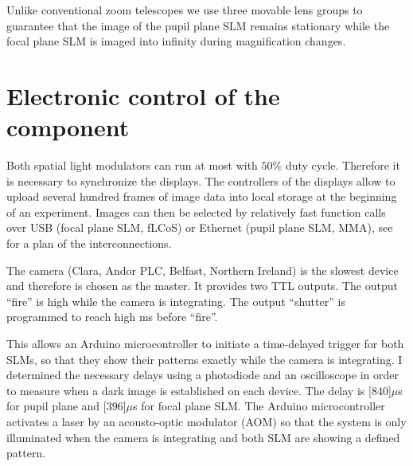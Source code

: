 Unlike conventional zoom telescopes we use three movable lens groups
to guarantee that the image of the pupil plane SLM remains stationary
while the focal plane SLM is imaged into infinity during magnification
changes.



\section{Electronic control of the component}
Both spatial light modulators can run at most with $50\%$ duty
 cycle. Therefore it is necessary to
synchronize the displays. The controllers of the displays allow to
upload several hundred frames of image data into local storage at the
beginning of an experiment. Images can then be selected by relatively
fast function calls over USB (focal plane SLM, fLCoS) or Ethernet
(pupil plane SLM, MMA), see  for a plan
of the interconnections.

The camera (Clara, Andor PLC, Belfast, Northern Ireland) is the
 slowest device and therefore is chosen as the
master. It provides two TTL outputs. The output ``fire'' is high while
the camera is integrating. The output ``shutter'' is programmed to reach
high \unit[1]{ms} before ``fire''.

This allows an Arduino microcontroller to initiate a time-delayed
trigger for both SLMs, so that they show their patterns exactly while
the camera is integrating. I determined the necessary delays using a
photodiode and an oscilloscope in order to measure when a dark image
is established on each device. The delay is \unit[$840$]{$\mu$s} for
pupil plane and \unit[$396$]{$\mu$s} for focal plane SLM. The Arduino
microcontroller activates a laser by an acousto-optic modulator (AOM)
so that the system is only illuminated when the camera is integrating
and both SLM are showing a defined pattern.  



